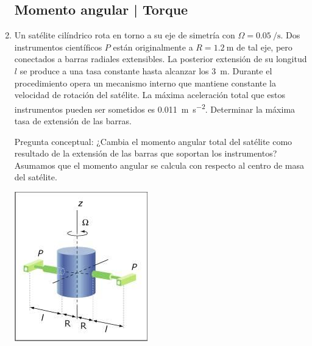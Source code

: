 \documentclass[11pt,spanish,a4paper]{article}
\begin{document}
\begin{enumerate}
\subsection*{Momento angular | Torque}

\item
\begin{minipage}[t][6.5cm]{0.65\textwidth}
Un satélite cilíndrico rota en torno a su eje de simetría con $\Omega= \SI{0,05}{\per\second}$.
Dos instrumentos científicos $P$ están originalmente a $R=\SI{1,2}{\metre}$ de tal eje, pero conectados a barras radiales extensibles.
La posterior extensión de su longitud $l$ se produce a una tasa constante hasta alcanzar los \SI{3}{\metre}.
Durante el procedimiento opera un mecanismo interno que mantiene constante la velocidad de rotación del satélite.
La máxima aceleración total que estos instrumentos pueden ser sometidos es \SI{0,011}{\metre\per\second\squared}.
Determinar la máxima tasa de extensión de las barras.

Pregunta conceptual:
¿Cambia el momento angular total del satélite como resultado de la extensión de las barras que soportan los instrumentos?
Asumamos que el momento angular se calcula con respecto al centro de masa del satélite.
\end{minipage}
\begin{minipage}[c][1cm][t]{0.3\textwidth}
	\includegraphics[width=\textwidth]{MIT2_003SCF11_pset2_e01}
\end{minipage}




\end{enumerate}
\end{document}
